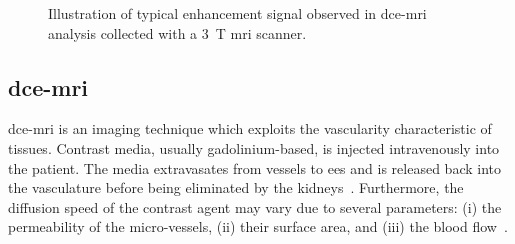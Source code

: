 \begin{figure}
  \centering
  \hspace*{\fill}
  \hfill
  \hspace*{\fill}
  \caption[Enhancement of \acs*{dce}-\acs*{mri} signal.]{Illustration of
    typical enhancement signal observed in \acs*{dce}-\acs*{mri} analysis
    collected with a \SI{3}{\tesla} \acs*{mri} scanner.}
  \label{fig:dceana}
\end{figure}

\subsection{\acs*{dce}-\acs*{mri}}\label{subsec:chp2:imaging:dce}
\Ac{dce}-\ac{mri} is an imaging technique which exploits the vascularity
characteristic of tissues.
Contrast media, usually gadolinium-based, is injected intravenously into the
patient.
The media extravasates from vessels to \ac{ees} and is released back into the
vasculature before being eliminated by the kidneys~\cite{Gribbestad2005}.
Furthermore, the diffusion speed of the contrast agent may vary due to several
parameters: (i) the permeability of the micro-vessels, (ii) their surface area,
and (iii) the blood flow~\cite{Padhani2002}.

